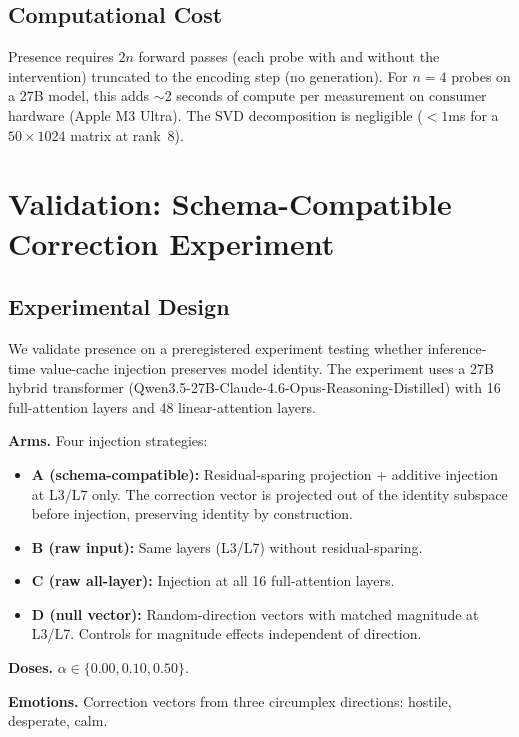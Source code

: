 \documentclass[11pt,a4paper]{article}
\begin{document}
\subsection{Computational Cost}

Presence requires $2n$ forward passes (each probe with and without the
intervention) truncated to the encoding step (no generation). For $n = 4$
probes on a 27B model, this adds $\sim$2 seconds of compute per measurement
on consumer hardware (Apple M3 Ultra). The SVD decomposition is negligible
($< 1$ms for a $50 \times 1024$ matrix at rank~8).

\section{Validation: Schema-Compatible Correction Experiment}
\label{sec:validation}

\subsection{Experimental Design}

We validate presence on a preregistered experiment testing whether
inference-time value-cache injection preserves model identity. The experiment
uses a 27B hybrid transformer
(Qwen3.5-27B-Claude-4.6-Opus-Reasoning-Distilled) with 16 full-attention
layers and 48 linear-attention layers.

\textbf{Arms.} Four injection strategies:
\begin{itemize}[nosep]
  \item \textbf{A (schema-compatible):} Residual-sparing projection +
    additive injection at L3/L7 only. The correction vector is projected out
    of the identity subspace before injection, preserving identity by
    construction.
  \item \textbf{B (raw input):} Same layers (L3/L7) without residual-sparing.
  \item \textbf{C (raw all-layer):} Injection at all 16 full-attention layers.
  \item \textbf{D (null vector):} Random-direction vectors with matched
    magnitude at L3/L7. Controls for magnitude effects independent of
    direction.
\end{itemize}

\textbf{Doses.} $\alpha \in \{0.00, 0.10, 0.50\}$.

\textbf{Emotions.} Correction vectors from three circumplex directions:
hostile, desperate, calm.
\end{document}
